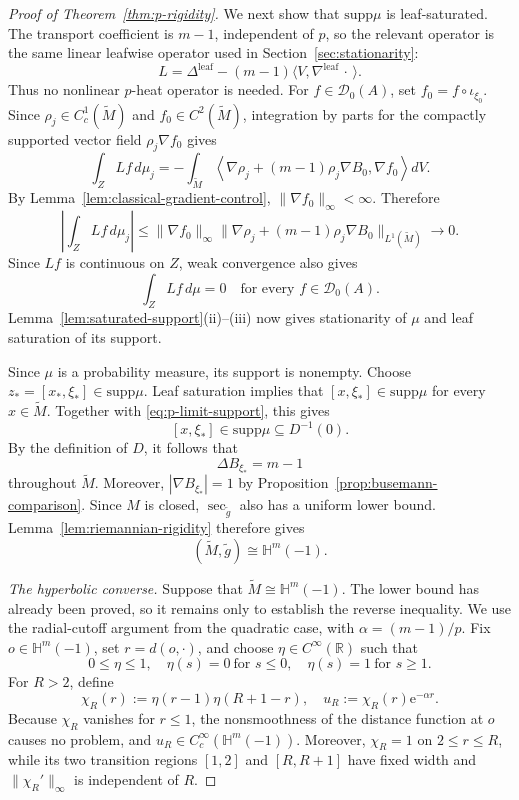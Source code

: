 \documentclass[12pt]{amsart}
\theoremstyle{definition}
\numberwithin{equation}{section}
\newcommand{\ee}{{\mathrm{e}}}
\newcommand{\mc}{\mathcal}
\newcommand{\wti}{\widetilde}
\newcommand{\bH}{\mathbb{H}}
\newcommand{\supp}{\mathrm{supp}}
\begin{document}
\begin{proof}[Proof of Theorem~\ref{thm:p-rigidity}]
We next show that \(\supp\mu\) is leaf-saturated.  The transport
coefficient is \(m-1\), independent of \(p\), so the relevant operator
is the same linear leafwise operator used in
Section~\ref{sec:stationarity}:
\[
  L=\Delta^{\mathrm{leaf}}
    -(m-1)\langle V,\nabla^{\mathrm{leaf}}\,\cdot\,\rangle.
\]
Thus no nonlinear \(p\)-heat operator is needed.  For
\(f\in\mc D_0(A)\),
set \(f_0=f\circ\iota_{\xi_0}\).  Since
\(\rho_j\in C_c^1(\wti M)\) and \(f_0\in C^2(\wti M)\), integration by
parts for the compactly supported vector field
\(\rho_j\nabla f_0\) gives
\[
  \int_ZLf\,d\mu_j
  =-\int_{\wti M}
    \left\langle
      \nabla\rho_j+(m-1)\rho_j\nabla B_0,
      \nabla f_0
    \right\rangle dV.
\]
By Lemma~\ref{lem:classical-gradient-control},
\(\|\nabla f_0\|_\infty<\infty\).  Therefore
\[
  \left|\int_ZLf\,d\mu_j\right|
  \leq
  \|\nabla f_0\|_\infty
  \|\nabla\rho_j+(m-1)\rho_j\nabla B_0\|_{L^1(\wti M)}
  \longrightarrow0.
\]
Since \(Lf\) is continuous on \(Z\), weak convergence also gives
\[
  \int_ZLf\,d\mu=0
  \quad\text{for every }f\in\mc D_0(A).
\]
Lemma~\ref{lem:saturated-support}\textup{(ii)}--\textup{(iii)} now gives
stationarity of \(\mu\) and leaf saturation of its support.

Since \(\mu\) is a probability measure, its support is nonempty.  Choose
\(z_*=[x_*,\xi_*]\in\supp\mu\).  Leaf saturation implies that
\([x,\xi_*]\in\supp\mu\) for every \(x\in\wti M\).  Together with
\eqref{eq:p-limit-support}, this gives
\[
  [x,\xi_*]\in\supp\mu\subseteq D^{-1}(0).
\]
By the definition of \(D\), it follows that
\[
  \Delta B_{\xi_*}=m-1
\]
throughout \(\wti M\).  Moreover,
\(|\nabla B_{\xi_*}|=1\) by
Proposition~\ref{prop:busemann-comparison}.
Since \(M\) is closed, \(\sec_{\wti g}\) also has a uniform lower bound.
Lemma~\ref{lem:riemannian-rigidity} therefore gives
\[
  (\wti M,\wti g)\cong\bH^m(-1).
\]

\emph{The hyperbolic converse.}
Suppose that \(\wti M\cong\bH^m(-1)\).  The lower bound has already
been proved, so it remains only to establish the reverse inequality.
We use the radial-cutoff argument from the quadratic case, with
\(\alpha=(m-1)/p\).  Fix \(o\in\bH^m(-1)\), set \(r=d(o,\cdot)\), and
choose \(\eta\in C^\infty(\mathbb R)\) such that
\[
  0\leq\eta\leq1,\quad
  \eta(s)=0\ \text{for }s\leq0,\quad
  \eta(s)=1\ \text{for }s\geq1.
\]
For \(R>2\), define
\[
  \chi_R(r):=\eta(r-1)\eta(R+1-r),
  \quad
  u_R:=\chi_R(r)\ee^{-\alpha r}.
\]
Because \(\chi_R\) vanishes for \(r\leq1\), the nonsmoothness of the
distance function at \(o\) causes no problem, and
\(u_R\in C_c^\infty(\bH^m(-1))\).  Moreover,
\(\chi_R=1\) on \(2\leq r\leq R\), while its two transition regions
\([1,2]\) and \([R,R+1]\) have fixed width and
\(\|\chi_R'\|_\infty\) is independent of \(R\).


\end{proof}
\end{document}
